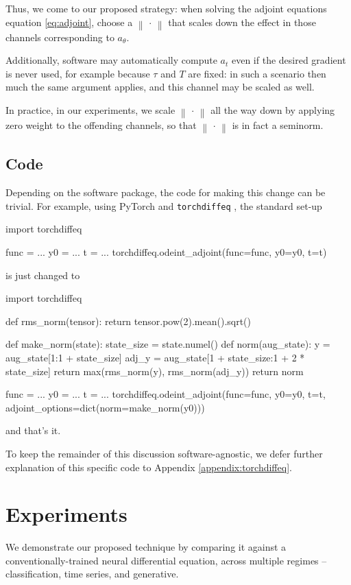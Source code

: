 \documentclass{article}
\theoremstyle{plain}
\theoremstyle{definition}
\newcommand{\norm}[1]{\left\|#1\right\|}
\begin{document}
Thus, we come to our proposed strategy: when solving the adjoint equations equation \eqref{eq:adjoint}, choose a $\norm{\,\cdot\,}$ that scales down the effect in those channels corresponding to $a_\theta$.

Additionally, software may automatically compute $a_t$ even if the desired gradient is never used, for example because $\tau$ and $T$ are fixed: in such a scenario then much the same argument applies, and this channel may be scaled as well.

In practice, in our experiments, we scale $\norm{\,\cdot\,}$ all the way down by applying zero weight to the offending channels, so that $\norm{\,\cdot\,}$ is in fact a seminorm.

\subsection{Code}
Depending on the software package, the code for making this change can be trivial. For example, using PyTorch and \texttt{torchdiffeq} \citep{neural-odes}, the standard set-up
\begin{python}
import torchdiffeq

func = ...
y0 = ...
t = ...
torchdiffeq.odeint_adjoint(func=func, y0=y0, t=t)
\end{python}
is just changed to
\begin{python}
import torchdiffeq

def rms_norm(tensor):
    return tensor.pow(2).mean().sqrt()

def make_norm(state):
    state_size = state.numel()
    def norm(aug_state):
        y = aug_state[1:1 + state_size]
        adj_y = aug_state[1 + state_size:1 + 2 * state_size]
        return max(rms_norm(y), rms_norm(adj_y))
    return norm

func = ...    
y0 = ...
t = ...
torchdiffeq.odeint_adjoint(func=func, y0=y0, t=t, 
                           adjoint_options=dict(norm=make_norm(y0)))
\end{python}
and that's it.

To keep the remainder of this discussion software-agnostic, we defer further explanation of this specific code to Appendix \ref{appendix:torchdiffeq}.

\section{Experiments}

We demonstrate our proposed technique by comparing it against a conventionally-trained neural differential equation, across multiple regimes -- classification, time series, and generative.
\end{document}
